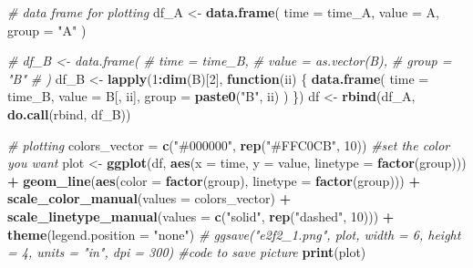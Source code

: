 \documentclass[
]{article}
\newenvironment{Shaded}{\begin{snugshade}}{\end{snugshade}}
\newcommand{\AttributeTok}[1]{\textcolor[rgb]{0.13,0.29,0.53}{#1}}
\newcommand{\CommentTok}[1]{\textcolor[rgb]{0.56,0.35,0.01}{\textit{#1}}}
\newcommand{\ControlFlowTok}[1]{\textcolor[rgb]{0.13,0.29,0.53}{\textbf{#1}}}
\newcommand{\DecValTok}[1]{\textcolor[rgb]{0.00,0.00,0.81}{#1}}
\newcommand{\FunctionTok}[1]{\textcolor[rgb]{0.13,0.29,0.53}{\textbf{#1}}}
\newcommand{\NormalTok}[1]{#1}
\newcommand{\OtherTok}[1]{\textcolor[rgb]{0.56,0.35,0.01}{#1}}
\newcommand{\SpecialCharTok}[1]{\textcolor[rgb]{0.81,0.36,0.00}{\textbf{#1}}}
\newcommand{\StringTok}[1]{\textcolor[rgb]{0.31,0.60,0.02}{#1}}
\begin{document}
\begin{Shaded}
\begin{Highlighting}[]
\CommentTok{\# data frame for plotting}
\NormalTok{df\_A }\OtherTok{\textless{}{-}} \FunctionTok{data.frame}\NormalTok{(  }
  \AttributeTok{time =}\NormalTok{ time\_A,  }
  \AttributeTok{value =}\NormalTok{ A,  }
  \AttributeTok{group =} \StringTok{"A"}  
\NormalTok{)  }
  
\CommentTok{\# df\_B \textless{}{-} data.frame(  }
\CommentTok{\#   time = time\_B,  }
\CommentTok{\#   value = as.vector(B),  }
\CommentTok{\#   group = "B"  }
\CommentTok{\# )  }
\NormalTok{df\_B }\OtherTok{\textless{}{-}} \FunctionTok{lapply}\NormalTok{(}\DecValTok{1}\SpecialCharTok{:}\FunctionTok{dim}\NormalTok{(B)[}\DecValTok{2}\NormalTok{], }\ControlFlowTok{function}\NormalTok{(ii) \{  }
  \FunctionTok{data.frame}\NormalTok{(  }
    \AttributeTok{time =}\NormalTok{ time\_B,  }
    \AttributeTok{value =}\NormalTok{ B[, ii],  }
    \AttributeTok{group =} \FunctionTok{paste0}\NormalTok{(}\StringTok{"B"}\NormalTok{, ii)  }
\NormalTok{  )  }
\NormalTok{\})  }
\NormalTok{df }\OtherTok{\textless{}{-}} \FunctionTok{rbind}\NormalTok{(df\_A, }\FunctionTok{do.call}\NormalTok{(rbind, df\_B))  }
    
\CommentTok{\# plotting}
\NormalTok{colors\_vector }\OtherTok{=} \FunctionTok{c}\NormalTok{(}\StringTok{"\#000000"}\NormalTok{, }\FunctionTok{rep}\NormalTok{(}\StringTok{"\#FFC0CB"}\NormalTok{, }\DecValTok{10}\NormalTok{))   }\CommentTok{\#set the color you want}
\NormalTok{ plot }\OtherTok{\textless{}{-}} \FunctionTok{ggplot}\NormalTok{(df, }\FunctionTok{aes}\NormalTok{(}\AttributeTok{x =}\NormalTok{ time, }\AttributeTok{y =}\NormalTok{ value, }\AttributeTok{linetype =} \FunctionTok{factor}\NormalTok{(group))) }\SpecialCharTok{+}      
     \FunctionTok{geom\_line}\NormalTok{(}\FunctionTok{aes}\NormalTok{(}\AttributeTok{color =} \FunctionTok{factor}\NormalTok{(group), }\AttributeTok{linetype =} \FunctionTok{factor}\NormalTok{(group))) }\SpecialCharTok{+}    
     \FunctionTok{scale\_color\_manual}\NormalTok{(}\AttributeTok{values =}\NormalTok{ colors\_vector) }\SpecialCharTok{+}    
     \FunctionTok{scale\_linetype\_manual}\NormalTok{(}\AttributeTok{values =} \FunctionTok{c}\NormalTok{(}\StringTok{"solid"}\NormalTok{, }\FunctionTok{rep}\NormalTok{(}\StringTok{"dashed"}\NormalTok{, }\DecValTok{10}\NormalTok{))) }\SpecialCharTok{+}  
     \FunctionTok{theme}\NormalTok{(}\AttributeTok{legend.position =} \StringTok{"none"}\NormalTok{)  }
\CommentTok{\# ggsave("e2f2\_1.png", plot, width = 6, height = 4, units = "in", dpi = 300) \#code to save picture}
\FunctionTok{print}\NormalTok{(plot)}
\end{Highlighting}
\end{Shaded}
\end{document}

